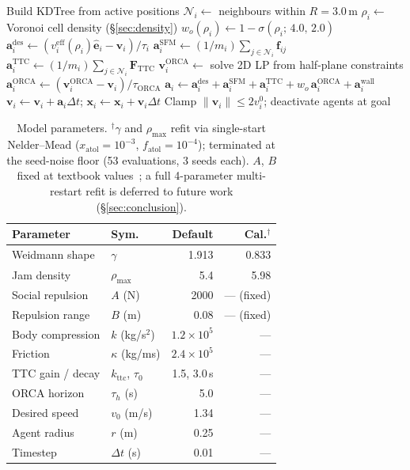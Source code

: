 \documentclass[a4paper,twoside]{article}
\begin{document}
\begin{algorithm}[h]
\caption{One simulation timestep (density-modulated additive steering).}\label{alg:step}
\begin{algorithmic}[1]
\State Build KDTree from active positions
\State $\mathcal{N}_i \gets$ neighbours within $R=3.0$\,m
\State $\rho_i \gets$ Voronoi cell density (\S\ref{sec:density})
\State $w_o(\rho_i) \gets 1 - \sigma(\rho_i;\,4.0,\,2.0)$
\State $\mathbf{a}_i^{\text{des}} \gets (v_i^{\text{eff}}(\rho_i)\hat{\mathbf{e}}_i - \mathbf{v}_i)/\tau_i$
\State $\mathbf{a}_i^{\text{SFM}} \gets (1/m_i)\sum_{j\in\mathcal{N}_i}\mathbf{f}_{ij}$ 
\State $\mathbf{a}_i^{\text{TTC}} \gets (1/m_i)\sum_{j\in\mathcal{N}_i}\mathbf{F}_{\text{TTC}}$ 
\State $\mathbf{v}_i^{\text{ORCA}} \gets$ solve 2D LP from half-plane constraints
\State $\mathbf{a}_i^{\text{ORCA}} \gets (\mathbf{v}_i^{\text{ORCA}}{-}\mathbf{v}_i)/\tau_{\text{ORCA}}$
\State $\mathbf{a}_i \gets \mathbf{a}_i^{\text{des}}{+}\mathbf{a}_i^{\text{SFM}}{+}\mathbf{a}_i^{\text{TTC}}{+}w_o\,\mathbf{a}_i^{\text{ORCA}}{+}\mathbf{a}_i^{\text{wall}}$
\State $\mathbf{v}_i \gets \mathbf{v}_i + \mathbf{a}_i\Delta t$; $\mathbf{x}_i \gets \mathbf{x}_i + \mathbf{v}_i\Delta t$
\State Clamp $\|\mathbf{v}_i\|\le 2 v_i^0$; deactivate agents at goal
\end{algorithmic}
\end{algorithm}

\begin{table}[h]
\caption{Model parameters. $^{\dagger}$$\gamma$ and $\rho_{\max}$ refit via single-start Nelder--Mead ($x_{\text{atol}}{=}10^{-3}$, $f_{\text{atol}}{=}10^{-4}$); terminated at the seed-noise floor (53 evaluations, 3 seeds each). $A$, $B$ fixed at textbook values~\cite{Helbing00}; a full 4-parameter multi-restart refit is deferred to future work (\S\ref{sec:conclusion}).}\label{tab:params}
\centering\scriptsize
\setlength{\tabcolsep}{5pt}
\begin{tabular}{@{}llrr@{}}
\toprule
\textbf{Parameter} & \textbf{Sym.} & \textbf{Default} & \textbf{Cal.$^{\dagger}$} \\
\midrule
Weidmann shape & $\gamma$ & 1.913 & 0.833 \\
Jam density & $\rho_{\max}$ & 5.4 & 5.98 \\
Social repulsion & $A$ (N) & 2000 & --- (fixed) \\
Repulsion range & $B$ (m) & 0.08 & --- (fixed) \\
Body compression & $k$ (kg/s$^2$) & $1.2{\times}10^5$ & --- \\
Friction & $\kappa$ (kg/ms) & $2.4{\times}10^5$ & --- \\
TTC gain / decay & $k_{\text{ttc}}$, $\tau_0$ & 1.5, 3.0\,s & --- \\
ORCA horizon & $\tau_h$ (s) & 5.0 & --- \\
Desired speed & $v_0$ (m/s) & 1.34 & --- \\
Agent radius & $r$ (m) & 0.25 & --- \\
Timestep & $\Delta t$ (s) & 0.01 & --- \\
\bottomrule
\end{tabular}
\end{table}
\end{document}

